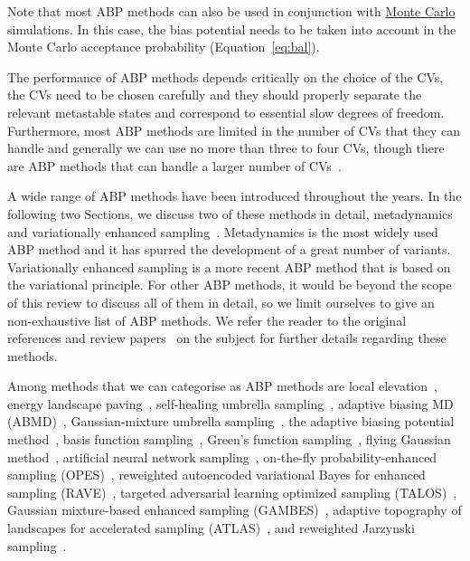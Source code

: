 \documentclass[9pt,review]{livecoms}
\begin{document}
Note that most ABP methods can also be used in conjunction with \hyperlink{ref:MetropolisMonteCarlo} {Monte Carlo} simulations. In this case, the bias potential needs to be taken into account in the Monte Carlo acceptance probability (Equation~\ref{eq:bal}).

The performance of ABP methods depends critically on the choice of the CVs, the CVs need to be chosen carefully and they should properly separate the relevant metastable states and correspond to essential slow degrees of freedom. Furthermore, most ABP methods are limited in the number of CVs that they can handle and generally we can use no more than three to four CVs, though there are ABP methods that can handle a larger number of CVs~\cite{Piana2007_bemeta,Pfaendtner2015_pbmetad}. 

A wide range of ABP methods have been introduced throughout the years. In the following two Sections, we discuss two of these methods in detail, metadynamics~\cite{Laio-PNAS-2002,Barducci-PRL-2008,Valsson2016_ARPC_MetaD} and variationally enhanced sampling~\cite{Valsson_VES_PRL_2014,Valsson2020Handbook_VES}. Metadynamics is the most widely used ABP method and it has spurred the development of a great number of variants. Variationally enhanced sampling is a more recent ABP method that is based on the variational principle. For other ABP methods, it would be beyond the scope of this review to discuss all of them in detail, so we limit ourselves to give an non-exhaustive list of ABP methods. We refer the reader to the original references and review papers~\cite{Dickson_ABP-Review_2017,Shalini_Review_2019,Allison_Review_2020} on the subject for further details regarding these methods.

Among methods that we can  categorise as ABP methods are
local elevation~\cite{Huber1994},
energy landscape paving~\cite{Hansmann-PRL-2002},
self-healing umbrella sampling~\cite{Marsili2006,Gersende_SelfHealing_2017},
adaptive biasing MD (ABMD)~\cite{Babin2008},
Gaussian-mixture umbrella sampling~\cite{Maragakis-JPCB-2009}, the adaptive biasing potential method~\cite{Dickson2010},
basis function sampling~\cite{Whitmer_BFS_2014}, Green's function sampling~\cite{Whitmer_GFS_2015}, flying Gaussian method~\cite{Sucur2016},
artificial neural network sampling~\cite{Sidky_ANNSampling_2018},
on-the-fly probability-enhanced sampling (OPES)~\cite{Invernizzi2020opus,invernizzi2020unified},
reweighted autoencoded variational Bayes for enhanced sampling (RAVE)~\cite{Tiwary_RAVE_2018},
targeted adversarial learning optimized sampling (TALOS)~\cite{Zhang_TALOS_2019},
Gaussian mixture-based enhanced sampling (GAMBES)~\cite{Debnath_GAMBES_2020},
adaptive topography of landscapes for accelerated sampling
(ATLAS)~\cite{giberti2021atlas},
and reweighted Jarzynski sampling~\cite{Bal_ReweightedJarzynski_2021}.
\end{document}
